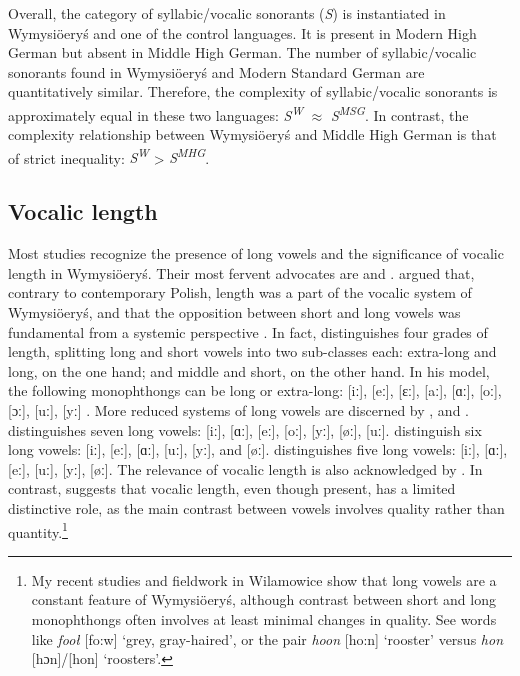 \documentclass[output=paper,hidelinks]{langscibook}
\begin{document}
Overall, the category of syllabic/vocalic sonorants (\textit{S}) is instantiated in Wymysiöeryś and one of the control languages. It is present in Modern High German but absent in Middle High German. The number of syllabic/vocalic sonorants found in Wymysiöeryś and Modern Standard German are quantitatively similar. Therefore, the complexity of syllabic/vocalic sonorants is approximately equal in these two languages: \textit{S\textsuperscript{W}} ${\approx}$ \textit{S\textsuperscript{MSG}}. In contrast, the complexity relationship between Wymysiöeryś and Middle High German is that of strict inequality: \textit{S\textsuperscript{W}} > \textit{S\textsuperscript{MHG}}. 


\subsection{Vocalic length}\label{sec:wymsorys:3.5}

Most studies recognize the presence of long vowels and the significance of vocalic length in Wymysiöeryś. Their most fervent advocates are \citet{kleczkowski_dialekt_1920} and \citet{mojmir_worterbuch}. \citet[174]{kleczkowski_dialekt_1920} argued that, contrary to contemporary Polish, length was a part of the vocalic system of Wymysiöeryś, and that the opposition between short and long vowels was fundamental from a systemic perspective \citep[11--12, 26--27]{kleczkowski_dialekt_1920}. In fact, \citet[26]{kleczkowski_dialekt_1920} distinguishes four grades of length, splitting long and short vowels into two sub-classes each: extra-long and long, on the one hand; and middle and short, on the other hand. In his model, the following monophthongs can be long or extra-long: [iː], [eː], [ɛː], [aː], [ɑː], [oː], [ɔː], [uː], [yː] \citep[11--12, 26--27]{kleczkowski_dialekt_1920}. More reduced systems of long vowels are discerned by \citet{lasatowicz_deutsche_1994, zieniukowa_sutuacja_2001}, and \citet{wicherkiewicz_making_2003}. \citet[40--41]{lasatowicz_deutsche_1994} distinguishes seven long vowels: [iː], [ɑː], [eː], [oː], [yː], [øː], [uː]. \citet[499--500]{zieniukowa_sutuacja_2001} distinguish six long vowels: [iː], [eː], [ɑː], [uː], [yː], and [øː]. \citet[405--407]{wicherkiewicz_making_2003} distinguishes five long vowels: [iː], [ɑː], [eː], [uː], [yː], [øː]. The relevance of vocalic length is also acknowledged by \citet[27--28]{andrason_grammar_2016}. In contrast, \citet[1--2]{weckwerth_polands_2015} suggests that vocalic length, even though present, has a limited distinctive role, as the main contrast between vowels involves quality rather than quantity.\footnote{My recent studies and fieldwork in Wilamowice show that long vowels are a constant feature of Wymysiöeryś, although contrast between short and long monophthongs often involves at least minimal changes in quality. See words like \textit{fooł} [fo:w] `grey, gray-haired', or the pair \textit{hoon} [ho:n] `rooster' versus \textit{hon} [hɔn]/[hon] `roosters'.}
\end{document}
